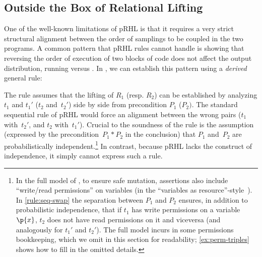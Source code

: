 \documentclass[acmsmall,nonacm,screen,appendix]{acmart}
\begin{document}
\subsection{Outside the Box of Relational Lifting}
\label{sec:overview:obox}




One of the well-known limitations of pRHL is that it requires
a very strict structural alignment between the order of samplings
to be coupled in the two programs.
A common pattern that pRHL rules cannot handle is
showing that reversing the order of execution of two blocks of code
does not affect the output distribution,
\eg running
   versus
  .
In \thelogic, we can establish this pattern using a \emph{derived} general rule:
\begin{proofrule}
  \label{rule:seq-swap}
\end{proofrule}
The rule assumes that the lifting of $R_1$ (resp. $R_2$) can be established
by analyzing $t_1$ and $t_1'$ ($t_2$ and~$t_2'$)
side by side from precondition $P_1$ ($P_2)$.
The standard sequential rule of pRHL would force an alignment
between the wrong pairs ($t_1$ with~$t_2'$, and $t_2$ with~$t_1'$).
Crucial to the soundness of the rule is the assumption
(expressed by the precondition~$P_1*P_2$ in the conclusion)
that $P_1$ and~$P_2$ are probabilistically independent.\footnote{
  In the full model of \thelogic,
  to ensure safe mutation, assertions also include ``write/read permissions''
  on variables (in the ``variables as resource''-style~\cite{BornatCY06}).
  In \ref{rule:seq-swap} the separation between $P_1$ and $P_2$ ensures,
  in addition to probabilistic independence, that if $t_1$ has write permissions
  on a variable~$\p{x}$, $t_2$ does not have read permissions on it and viceversa (and analogously for $t_1'$ and $t_2'$).
  The full model incurs in some permissions bookkeeping,
  which we omit in this section for readability;
  \cref{ex:perm-triples} shows how to fill in the omitted details.}
In contrast, because pRHL lacks the construct of independence,
it simply cannot express such a rule.
\end{document}
